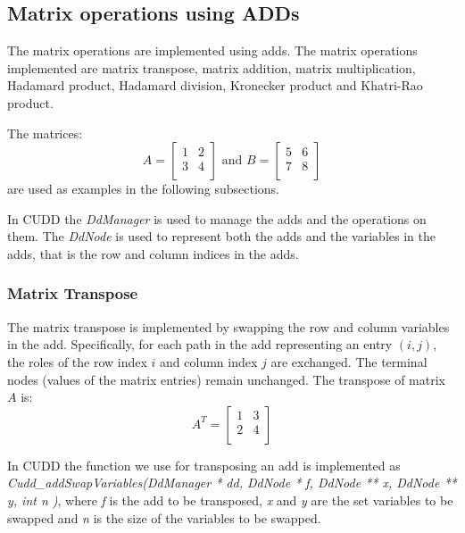 \subsection{Matrix operations using ADDs}\label{subsec:matrix-operations-using-adds}
The matrix operations are implemented using \glspl{add}.
The matrix operations implemented are matrix transpose, matrix addition, matrix multiplication, Hadamard product, Hadamard division, Kronecker product and Khatri-Rao product.

The matrices:
\[
    A = \begin{bmatrix}
            1 & 2 \\
            3 & 4 \\
    \end{bmatrix}
\text{ and }
    B = \begin{bmatrix}
            5 & 6 \\
            7 & 8 \\
    \end{bmatrix}
\]
are used as examples in the following subsections.

In CUDD the \textit{DdManager} is used to manage the \glspl{add} and the operations on them.
The \textit{DdNode} is used to represent both the \glspl{add} and the variables in the \glspl{add}, that is the row and column indices in the \glspl{add}.

\subsubsection{Matrix Transpose}
The matrix transpose is implemented by swapping the row and column variables in the \gls{add}. Specifically, for each path in the \gls{add} representing an entry $(i, j)$, the roles of the row index 
$i$ and column index $j$ are exchanged. The terminal nodes (values of the matrix entries) remain unchanged.
The transpose of matrix $A$ is:
\[
    A^T = \begin{bmatrix}
              1 & 3 \\
              2 & 4 \\
    \end{bmatrix}
\]

In CUDD the function we use for transposing an \gls{add} is implemented as \textit{Cudd\_addSwapVariables(DdManager * dd, DdNode * f, DdNode ** x, DdNode ** y, int  n )}, where \textit{f} is the \gls{add} to be transposed, \textit{x} and \textit{y} are the set variables to be swapped and \textit{n} is the size of the variables to be swapped.

